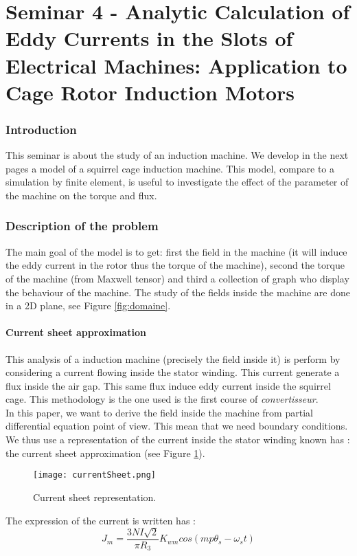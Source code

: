 \part{Seminar 4 - Analytic Calculation of Eddy Currents in the Slots of Electrical Machines:
Application to Cage Rotor Induction Motors}



\section{Introduction}
This seminar is about the study of an induction machine. We develop in the next pages a model of a squirrel cage induction machine. This model, compare to a simulation by finite element, is useful to investigate the effect of the parameter of the machine on the torque and flux. 
\section{Description of the problem}
The main goal of the model is to get: first the field in the machine (it will induce the eddy current in the rotor thus the torque of the machine), second the torque of the machine (from Maxwell tensor) and third a collection of graph who display the behaviour of the machine. The study of the fields inside the machine are done in a 2D plane, see Figure \ref{fig:domaine}.
\subsection{Current sheet approximation}
This analysis of a induction machine (precisely the field inside it) is perform by considering a current flowing inside the stator winding. This current generate a flux inside the air gap. This same flux induce eddy current inside the squirrel cage. This methodology is the one used is the first course of \textit{convertisseur}.\\
In this paper, we want to derive the field inside the machine from partial differential equation point of view. This mean that we need boundary conditions. We thus use a representation of the current inside the stator winding known has : the current sheet approximation (see Figure \ref{fig:sheet}).
\begin{figure}[H]
    \centering
    \texttt{[image: currentSheet.png]}
    \caption{Current sheet representation.}
    \label{fig:sheet}
\end{figure}
The expression of the current is written has : 
\begin{equation}
    J_{m} = \dfrac{3NI\sqrt{2}}{\pi R_{3}}K_{wm}cos(mp\theta_{s}-\omega_{s}t)
\end{equation}

